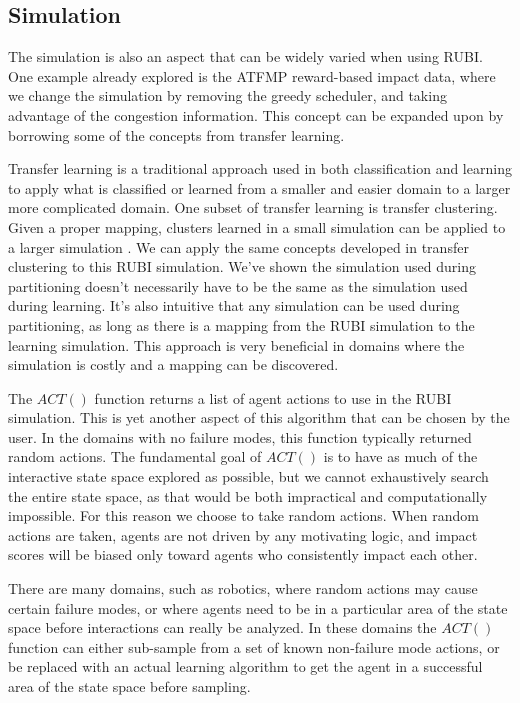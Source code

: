 \documentclass{aamas2014}
\begin{document}
\subsection{Simulation}
The simulation is also an aspect that can be widely varied when using RUBI. One example already explored is the ATFMP reward-based impact data, where we change the simulation by removing the greedy scheduler, and taking advantage of the congestion information. This concept can be expanded upon by borrowing some of the concepts from transfer learning.

Transfer learning is a traditional approach used in both classification and learning to apply what is classified or learned from a smaller and easier domain to a larger more complicated domain. One subset of transfer learning is transfer clustering. Given a proper mapping, clusters learned in a small simulation can be applied to a larger simulation \cite{6378284}. We can apply the same concepts developed in transfer clustering to this RUBI simulation. We've shown the simulation used during partitioning doesn't necessarily have to be the same as the simulation used during learning. It's also intuitive that any simulation can be used during partitioning, as long as there is a mapping from the RUBI simulation to the learning simulation. This approach is very beneficial in domains where the simulation is costly and a mapping can be discovered. 

The $ACT()$ function returns a list of agent actions to use in the RUBI simulation. This is yet another aspect of this algorithm that can be chosen by the user. In the domains with no failure modes, this function typically returned random actions. The fundamental goal of $ACT()$ is to have as much of the interactive state space explored as possible, but we cannot exhaustively search the entire state space, as that would be both impractical and computationally impossible. For this reason we choose to take random actions. When random actions are taken, agents are not driven by any motivating logic, and impact scores will be biased only toward agents who consistently impact each other. 

There are many domains, such as robotics, where random actions may cause certain failure modes, or where agents need to be in a particular area of the state space before interactions can really be analyzed. In these domains the $ACT()$ function can either sub-sample from a set of known non-failure mode actions, or be replaced with an actual learning algorithm to get the agent in a successful area of the state space before sampling. 
\end{document}
